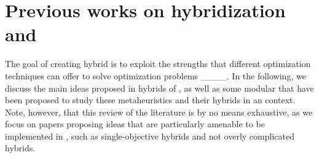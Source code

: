 \section{Previous works on hybridization and \ad}
\label{sec:Previous works on hybridization}
The goal of creating hybrid \mhs is to exploit the strengths that different optimization techniques can offer to solve optimization problems%
____.
In the following, we discuss the main ideas proposed in hybrids of \algInPaper, as well as some modular \msfs that have been proposed to study these metaheuristics and their hybrids in an \ad context.
Note, however, that this review of the literature is by no means exhaustive, as we focus on papers proposing ideas that are particularly amenable to be implemented in \MetafoR, such as single-objective hybrids and not overly complicated hybrids.

